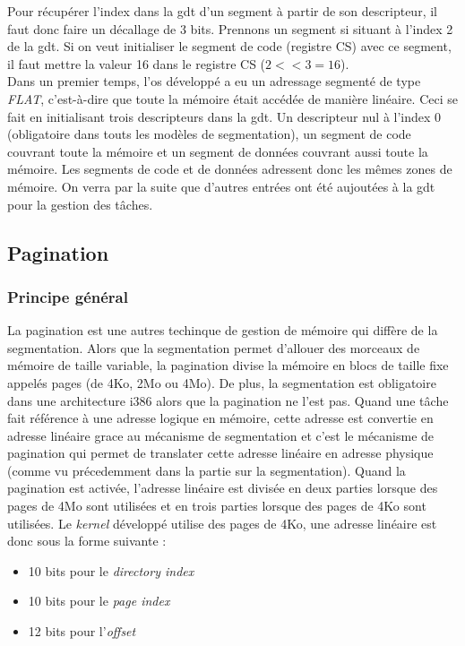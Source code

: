 \documentclass[a4paper, 12pt]{article}
\begin{document}
Pour récupérer l'index dans la \acrshort{gdt} d'un segment à partir de son descripteur,
il faut donc faire un décallage de 3 bits. Prennons un segment si situant à l'index
2 de la \acrshort{gdt}. Si on veut initialiser le segment de code (registre CS)
avec ce segment, il faut mettre la valeur 16 dans le registre CS ($2 << 3 = 16$). \\

Dans un premier temps, l'\acrshort{os} développé a eu un adressage segmenté de type
\textit{FLAT}, c'est-à-dire que toute la mémoire était accédée de manière linéaire.
Ceci se fait en initialisant trois descripteurs dans la \acrshort{gdt}. Un descripteur
nul à l'index 0 (obligatoire dans touts les modèles de segmentation), un segment
de code couvrant toute la mémoire et un segment de données couvrant aussi toute la mémoire.
Les segments de code et de données adressent donc les mêmes zones de mémoire.
On verra par la suite que d'autres entrées ont été aujoutées à la \acrshort{gdt}
pour la gestion des tâches.


\subsection{Pagination}
\subsubsection{Principe général}
La pagination est une autres techinque de gestion de mémoire qui diffère de la
segmentation. Alors que la segmentation permet d'allouer des morceaux de mémoire
de taille variable, la pagination divise la mémoire en blocs de taille fixe appelés
pages (de 4Ko, 2Mo ou 4Mo). De plus, la segmentation est obligatoire dans une
architecture i386 alors que la pagination ne l'est pas\cite{ref16}. Quand une tâche
fait référence à une adresse logique en mémoire, cette adresse est convertie en
adresse linéaire grace au mécanisme de segmentation et c'est le mécanisme de
pagination qui permet de translater cette adresse linéaire en adresse physique
(comme vu précedemment dans la partie sur la segmentation). Quand la
pagination est activée, l'adresse linéaire est divisée en deux parties lorsque
des pages de 4Mo sont utilisées et en trois parties lorsque des pages de 4Ko
sont utilisées. Le \textit{kernel} développé utilise des pages de 4Ko, une adresse
linéaire est donc sous la forme suivante :

\begin{itemize}[label=\textbullet]
	\item 10 bits pour le \textit{directory index}
	\item 10 bits pour le \textit{page index}
    \item 12 bits pour l'\textit{offset}
\end{itemize}
\end{document}
